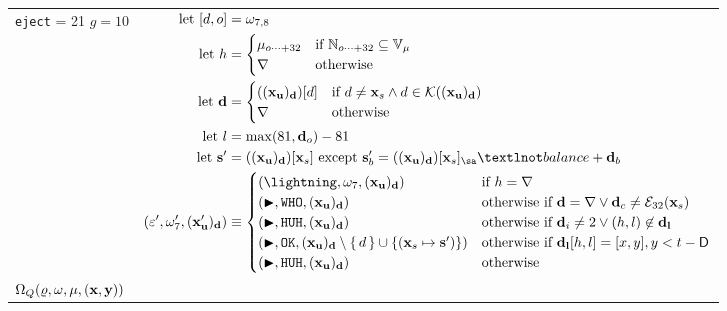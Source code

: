 \begin{longtable}{p{3.5cm} p{12.5cm}}
{  \texttt{eject} = 21 \\
  $g = 10$} &
  $\begin{aligned}
    \using [d, o] &= \registers_{7, 8} \\
    \using h &= \begin{cases}
      \memory_{o\dots+32} &\when \N_{o \dots+ 32} \subseteq \readable{\memory} \\
      \error &\otherwise
    \end{cases} \\
    \using \mathbf{d} &= \begin{cases}
      ((\mathbf{x}_\mathbf{u})_\mathbf{d})[d] &\when d \ne \mathbf{x}_s \wedge d \in \Fkeys{(\mathbf{x}_\mathbf{u})_\mathbf{d}} \\
      \error &\otherwise \\
    \end{cases} \\
    \using l &= \max(81, \mathbf{d}_o) - 81 \\
    \using \mathbf{s}' &= ((\mathbf{x}_\mathbf{u})_\mathbf{d})[\mathbf{x}_s] \exc \mathbf{s}'_b = ((\mathbf{x}_\mathbf{u})_\mathbf{d})[\mathbf{x}_s]_\sa¬balance + \mathbf{d}_b \\
    (\execst', \registers'_7, (\mathbf{x}'_\mathbf{u})_\mathbf{d}) &\equiv \begin{cases}
      (\panic, \registers_7, (\mathbf{x}_\mathbf{u})_\mathbf{d}) &\when h = \error \\
      (\continue, \mathtt{WHO}, (\mathbf{x}_\mathbf{u})_\mathbf{d}) &\otherwhen \mathbf{d} = \error \vee \mathbf{d}_c \ne \se_{32}(\mathbf{x}_s) \\
      (\continue, \mathtt{HUH}, (\mathbf{x}_\mathbf{u})_\mathbf{d}) &\otherwhen \mathbf{d}_i \ne 2 \vee (h, l) \not\in \mathbf{d}_\mathbf{l} \\
      (\continue, \mathtt{OK}, (\mathbf{x}_\mathbf{u})_\mathbf{d} \setminus \set{d} \cup \set{ \kv{\mathbf{x}_s}{\mathbf{s}'} }) &\otherwhen \mathbf{d}_\mathbf{l}[h, l] = [x, y], y < t - \mathsf{D} \\
      (\continue, \mathtt{HUH}, (\mathbf{x}_\mathbf{u})_\mathbf{d}) &\otherwise \\
    \end{cases} \\
  \end{aligned}$\\
  \cmidrule(lr){1-1}\cmidrule(lr){2-2}
  \makecell*[l]{
  $\Omega_Q(\varrho, \omega, \mu, (\mathbf{x}, \mathbf{y}))$ \\
}
\end{longtable}
